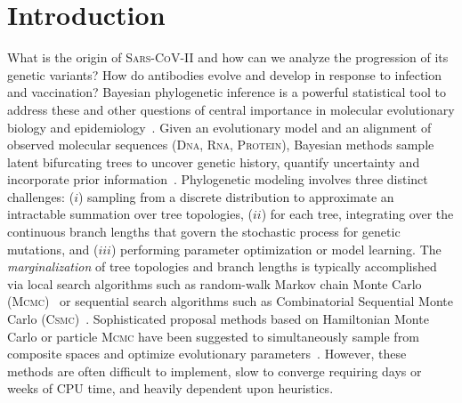 \documentclass[accepted]{uai2021} %
\theoremstyle{definition}
\begin{document}
\section{Introduction}\label{sec:intro}
\let\thefootnote\relax{}
What is the origin of \textsc{Sars-CoV-II} and how can we analyze the progression of its genetic variants? How do antibodies evolve and develop in response to infection and vaccination? Bayesian phylogenetic inference is a powerful statistical tool to address these and other questions of central importance in molecular evolutionary biology and epidemiology~\citep{Dhar_2020,abf4c405af0c4229bee83cefc6b9501f}. Given an evolutionary model and an alignment of observed molecular sequences (\textsc{Dna}, \textsc{Rna}, \textsc{Protein}), Bayesian methods sample latent bifurcating trees to uncover genetic history, quantify uncertainty and incorporate prior information~\citep{10.1093/bioinformatics/17.8.754}.
Phylogenetic modeling involves three distinct challenges: ($i$) sampling from a discrete distribution to approximate an intractable summation over tree topologies, ($ii$) for each tree, integrating over the continuous branch lengths that govern the stochastic process for genetic mutations, and ($iii$) performing parameter optimization or model learning. The \textit{marginalization} of tree topologies and branch lengths is typically accomplished via local search algorithms such as random-walk Markov chain Monte Carlo (\textsc{Mcmc})~\citep{10.1093/bioinformatics/17.8.754} or sequential search algorithms such as Combinatorial Sequential Monte Carlo (\textsc{Csmc})~\citep{[pset]}. 
Sophisticated proposal methods based on Hamiltonian Monte Carlo or particle \textsc{Mcmc} have been suggested to simultaneously sample from composite spaces and optimize evolutionary parameters~\citep{pmlr-v70-dinh17a,csmc,wang2020particle}. However, these methods are often difficult to implement, slow to converge requiring days or weeks of CPU time, and heavily dependent upon heuristics.  
\end{document}
